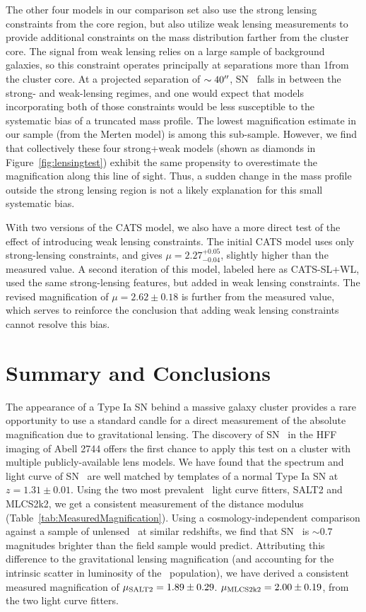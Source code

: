 The other four models in our comparison set also use the strong
lensing constraints from the core region, but also utilize weak
lensing measurements to provide additional constraints on the mass
distribution farther from the cluster core.  The signal from weak
lensing relies on a large sample of background galaxies, so this
constraint operates principally at separations more than 1\arcmin from
the cluster core.  At a projected separation of $\sim40^{\prime\prime}$,
SN \tomas\ falls in between the strong- and weak-lensing regimes, and
one would expect that models incorporating both of those constraints
would be less susceptible to the systematic bias of a truncated mass
profile.  The lowest magnification estimate in our sample (from the
Merten model) is among this sub-sample.  However, we find that
collectively these four strong+weak models (shown as diamonds in
Figure~\ref{fig:lensingtest}) exhibit the same propensity to
overestimate the magnification along this line of sight.  Thus, a
sudden change in the mass profile outside the strong lensing region is
not a likely explanation for this small systematic bias.

With two versions of the CATS model, we also have a more direct test
of the effect of introducing weak lensing constraints.  The initial
CATS model uses only strong-lensing constraints, and gives
$\mu=2.27^{+0.05}_{-0.04}$, slightly higher than the measured value.
A second iteration of this model, labeled here as CATS-SL+WL, used the
same strong-lensing features, but added in weak lensing constraints.
The revised magnification of $\mu=2.62\pm0.18$ is further from the
measured value, which serves to reinforce the conclusion that adding
weak lensing constraints cannot resolve this bias.


\section{Summary and Conclusions}
\label{sec:SummaryAndConclusions}

The appearance of a Type Ia SN behind a massive galaxy cluster
provides a rare opportunity to use a standard candle for a direct
measurement of the absolute magnification due to gravitational
lensing.  The discovery of SN \tomas\ in the HFF imaging of Abell 2744
offers the first chance to apply this test on a cluster with multiple
publicly-available lens models.  We have found that the spectrum and
light curve of SN \tomas\ are well matched by templates of a normal
Type Ia SN at $z=1.31\pm0.01$.  Using the two most prevalent \SNIa\
light curve fitters, SALT2 and MLCS2k2, we get a consistent
measurement of the distance modulus
(Table~\ref{tab:MeasuredMagnification}).  Using a
cosmology-independent comparison against a sample of unlensed \SNeIa\
at similar redshifts, we find that SN \tomas\ is $\sim0.7$ magnitudes
brighter than the field sample would predict.  Attributing this
difference to the gravitational lensing magnification (and accounting
for the intrinsic scatter in luminosity of the \SNIa\ population), we
have derived a consistent measured magnification of $\mu_{\rm
SALT2}=1.89\pm0.29$.  $\mu_{\rm MLCS2k2}=2.00\pm0.19$, from the two
light curve fitters.

